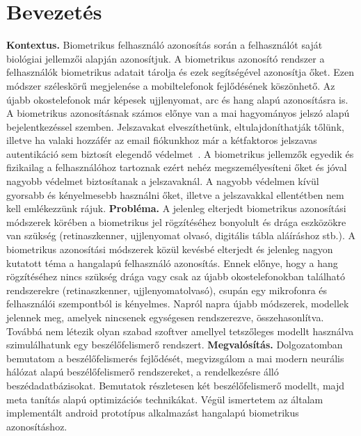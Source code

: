 \chapter{Bevezetés}

\textbf{Kontextus.} Biometrikus felhasználó azonosítás során a felhasználót saját biológiai jellemzői alapján azonosítjuk. A biometrikus azonosító rendszer a felhasználók biometrikus adatait tárolja és ezek segítségével azonosítja őket. Ezen módszer széleskörű megjelenése a mobiltelefonok fejlődésének köszönhető. Az újabb okostelefonok már képesek ujjlenyomat, arc és hang alapú azonosításra is.
\newline
\newline
A biometrikus azonosításnak számos előnye van a mai hagyományos jelszó alapú bejelentkezéssel szemben. Jelszavakat elveszíthetünk, eltulajdoníthatják tőlünk, illetve ha valaki hozzáfér az email fiókunkhoz már a kétfaktoros jelszavas autentikáció sem biztosít elegendő védelmet~\cite{nicolls_2019}. A biometrikus jellemzők egyedik és fizikailag a felhasználóhoz tartoznak ezért nehéz megszemélyesíteni őket és jóval nagyobb védelmet biztosítanak a jelszavaknál. A nagyobb védelmen kívül gyorsabb és kényelmesebb használni őket, illetve a jelszavakkal ellentétben nem kell emlékezzünk rájuk.
\newline
\newline
\textbf{Probléma.} A jelenleg elterjedt biometrikus azonosítási módszerek körében a biometrikus jel rögzítéséhez bonyolult és drága eszközökre van szükség (retinaszkenner, ujjlenyomat olvasó, digitális tábla aláíráshoz stb.).
\newline
\newline
A biometrikus azonosítási módszerek közül kevésbé elterjedt és jelenleg nagyon kutatott téma a hangalapú felhasználó azonosítás. Ennek előnye, hogy a hang rögzítéséhez nincs szükség drága vagy csak az újabb okostelefonokban található rendszerekre (retinaszkenner, ujjlenyomatolvasó), csupán egy mikrofonra és felhasználói szempontból is kényelmes.
\newline
\newline
Napról napra újabb módszerek, modellek jelennek meg, amelyek nincsenek egységesen rendszerezve, összehasonlítva. Továbbá nem létezik olyan szabad szoftver amellyel tetszőleges modellt használva szimulálhatunk egy beszélőfelismerő rendszert.
\newline
\newline
\textbf{Megvalósítás.} Dolgozatomban bemutatom a beszélőfelismerés fejlődését, megvizsgálom a mai modern neurális hálózat alapú beszélőfelismerő rendszereket, a rendelkezésre álló beszédadatbázisokat. Bemutatok részletesen két beszélőfelismerő modellt, majd meta tanítás alapú optimizációs technikákat. Végül ismertetem az általam implementált android prototípus alkalmazást hangalapú biometrikus azonosításhoz.
